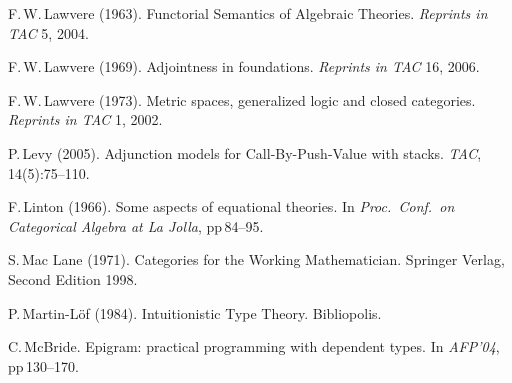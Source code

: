 \documentclass[11pt,twocolumn]{article}
\begin{document}
{\begin{thebibliography}{000}
F.\,W.\,Lawvere (1963). %
\newblock Functorial Semantics of Algebraic Theories. %
\newblock \emph{Reprints in TAC} 5, 2004.
  
F.\,W.\,Lawvere (1969).
\newblock Adjointness in foundations.
\newblock \emph{Reprints in TAC} 16, 2006.

F.\,W.\,Lawvere (1973).
\newblock Metric spaces, generalized logic and closed categories.
\newblock \emph{Reprints in TAC} 1, 2002.


P.\,Levy (2005).
\newblock Adjunction models for Call-By-Push-Value with stacks.
\newblock \emph{TAC}, 14(5):75--110.

F.\,Linton (1966).
\newblock Some aspects of equational theories.
\newblock In {\em Proc.\ Conf.\ on Categorical Algebra at La Jolla}, pp\,84--95.



S.\,Mac Lane (1971).
\newblock Categories for the Working Mathematician.
\newblock Springer Verlag, Second Edition 1998.


P.\,Martin-L{\"o}f (1984).
\newblock Intuitionistic Type Theory.
\newblock Bibliopolis.


C.\,McBride.
\newblock Epigram: practical programming with dependent types.
\newblock In \emph{AFP'04}, pp\,130--170.


\end{thebibliography}}
\end{document}
